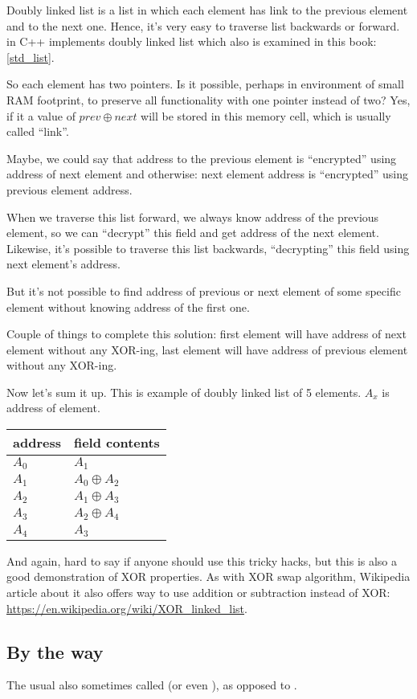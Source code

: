 Doubly linked list is a list in which each element has link to the previous element and to the next one.
Hence, it's very easy to traverse list backwards or forward.
 in C++ implements doubly linked list which also is examined in this book: \ref{std_list}.

So each element has two pointers.
Is it possible, perhaps in environment of small \ac{RAM} footprint, to preserve all functionality with one pointer instead of two?
Yes, if it a value of $prev \oplus next$ will be stored in this memory cell, which is usually called ``link''.

Maybe, we could say that address to the previous element is ``encrypted'' using address of next element and otherwise:
next element address is ``encrypted'' using previous element address.

When we traverse this list forward, we always know address of the previous element, so we can ``decrypt'' this field and get 
address of the next element.
Likewise, it's possible to traverse this list backwards, ``decrypting'' this field using next element's address.

But it's not possible to find address of previous or next element of some specific element without
knowing address of the first one.

Couple of things to complete this solution: first element will have address of next element without any XOR-ing,
last element will have address of previous element without any XOR-ing.

Now let's sum it up. This is example of doubly linked list of 5 elements.
$A_x$ is address of element.

\begin{center}
\begin{tabular}{ | l | l | }
	\hline
	\HeaderColor address & \HeaderColor \IT{link} field contents \\
	\hline
	$A_0$ & $A_1$ \\
	\hline
	$A_1$ & $A_0 \oplus A_2$ \\
	\hline
	$A_2$ & $A_1 \oplus A_3$ \\
	\hline
	$A_3$ & $A_2 \oplus A_4$ \\
	\hline
	$A_4$ & $A_3$ \\
	\hline
\end{tabular}
\end{center}

And again, hard to say if anyone should use this tricky hacks, but this is also a good demonstration of XOR properties.
As with XOR swap algorithm, Wikipedia article about it also offers way to use addition or subtraction instead of XOR:
\url{https://en.wikipedia.org/wiki/XOR_linked_list}.

\subsection{By the way}

The usual  also sometimes called  (or even ), as opposed to .

